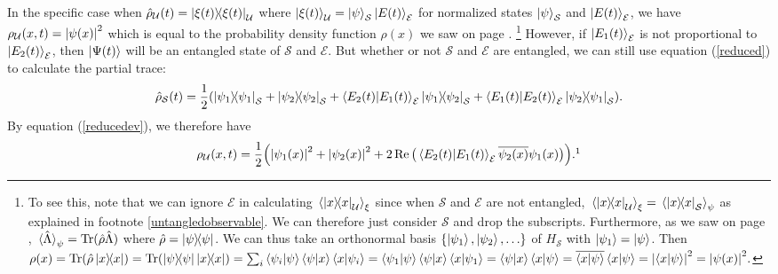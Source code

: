 \documentclass[letter, 12pt]{turabian-thesis}
\theoremstyle{hypothesis}
\let\origfootnote\footnote %
\renewcommand{\footnote}[1]{%
\noindent %
\origfootnote{#1}}
\renewcommand{\Tr}{\operatorname{Tr}}
\begin{document}
 In the specific case when $\hat{\rho}_\mathcal{U}(t)=\dyad{\xi(t)}_\mathcal{U}$ where $\ket{\xi(t)}_\mathcal{U}=\ket{\psi}_\mathcal{S}\ket{E(t)}_\mathcal{E}$ for normalized states $\ket{\psi}_\mathcal{S}$ and $\ket{E(t)}_\mathcal{E}$, we have $\rho_\mathcal{U}(x, t) =\abs{\psi(x)}^2$ which is equal to the probability density function $\rho(x)$ we saw on page \pageref{rhodensity}.\footnote{To see this, note that we can ignore $\mathcal{E}$ in calculating $\ev*{\dyad{x}_\mathcal{U}}_\xi$ since when $\mathcal{S}$ and $\mathcal{E}$ are not entangled, $\ev*{\dyad{x}_\mathcal{U}}_\xi = \ev*{\dyad{x}_\mathcal{S}}_\psi$ as explained in footnote \ref{untangledobservable}. We can therefore just consider $\mathcal{S}$ and drop the subscripts.
Furthermore, as we saw on page \pageref{traceev}, $\ev*{\hat{\Lambda}}_\psi=\Tr(\hat{\rho}\hat{\Lambda})$ where $\hat{\rho}=\dyad{\psi}$. 
We can thus take an orthonormal basis $\{\ket{\psi_1},\ket{\psi_2},\ldots\}$ of $H_\mathcal{S}$ with $\ket{\psi_1}=\ket{\psi}$. 
Then $\rho(x)=\Tr(\hat{\rho}\dyad{x})=\Tr(\dyad{\psi}\dyad{x})=\sum_i\ip{\psi_i}{\psi}\ip{\psi}{x}\ip{x}{\psi_i}=\ip{\psi_1}{\psi}\ip{\psi}{x}\ip{x}{\psi_1} =\ip{\psi}{x}\ip{x}{\psi}=\overline{\ip{x}{\psi}}\ip{x}{\psi}=\abs{\ip{x}{\psi}}^2=\abs{\psi(x)}^2.$} 
However, if $\ket{E_1(t)}_\mathcal{E}$ is not proportional to $\ket{E_2(t)}_\mathcal{E}$, then $\ket{\Psi(t)}$ will be an entangled state of $\mathcal{S}$ and $\mathcal{E}$. But whether or not $\mathcal{S}$ and $\mathcal{E}$ are entangled, we can still use equation (\ref{reduced}) to calculate the partial trace:
$$\hat{\rho}_\mathcal{S}(t)=\frac{1}{2}(\dyad{\psi_1}_\mathcal{S}+\dyad{\psi_2}_\mathcal{S}+\ip{E_2(t)}{E_1(t)}_\mathcal{E} \dyad{\psi_1}{\psi_2}_\mathcal{S}+\ip{E_1(t)}{E_2(t)}_\mathcal{E} \dyad{\psi_2}{\psi_1}_\mathcal{S}).$$
By equation (\ref{reducedev}), we therefore have
\begin{equation}\rho_\mathcal{U}(x, t)=\frac{1}{2}\Big(\abs{\psi_1(x)}^2+\abs{\psi_2(x)}^2+2\Re\big(\ip{E_2(t)}{E_1(t)}_\mathcal{E}\overline{\psi_2(x)}\psi_1(x)\big)\Big).\protect\footnotemark
\end{equation}
\end{document}
